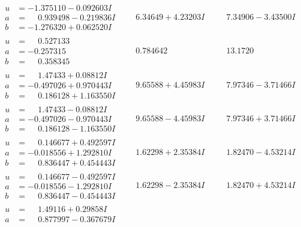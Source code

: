 \documentclass[1p]{elsarticle_modified}
\theoremstyle{definition}
\begin{document}
$$\begin{array}{c|c|c}
\begin{aligned}
u &= -1.375110 - 0.092603 I \\
a &= \phantom{-}0.939498 - 0.219836 I \\
b &= -1.276320 + 0.062520 I\end{aligned}
 & \phantom{-}6.34649 + 4.23203 I & \phantom{-}7.34906 - 3.43500 I \\ \hline\begin{aligned}
u &= \phantom{-}0.527133\phantom{ +0.000000I} \\
a &= -0.257315\phantom{ +0.000000I} \\
b &= \phantom{-}0.358345\phantom{ +0.000000I}\end{aligned}
 & \phantom{-}0.784642\phantom{ +0.000000I} & \phantom{-}13.1720\phantom{ +0.000000I} \\ \hline\begin{aligned}
u &= \phantom{-}1.47433 + 0.08812 I \\
a &= -0.497026 + 0.970443 I \\
b &= \phantom{-}0.186128 + 1.163550 I\end{aligned}
 & \phantom{-}9.65588 + 4.45983 I & \phantom{-}7.97346 - 3.71466 I \\ \hline\begin{aligned}
u &= \phantom{-}1.47433 - 0.08812 I \\
a &= -0.497026 - 0.970443 I \\
b &= \phantom{-}0.186128 - 1.163550 I\end{aligned}
 & \phantom{-}9.65588 - 4.45983 I & \phantom{-}7.97346 + 3.71466 I \\ \hline\begin{aligned}
u &= \phantom{-}0.146677 + 0.492597 I \\
a &= -0.018556 + 1.292810 I \\
b &= \phantom{-}0.836447 + 0.454443 I\end{aligned}
 & \phantom{-}1.62298 + 2.35384 I & \phantom{-}1.82470 - 4.53214 I \\ \hline\begin{aligned}
u &= \phantom{-}0.146677 - 0.492597 I \\
a &= -0.018556 - 1.292810 I \\
b &= \phantom{-}0.836447 - 0.454443 I\end{aligned}
 & \phantom{-}1.62298 - 2.35384 I & \phantom{-}1.82470 + 4.53214 I \\ \hline\begin{aligned}
u &= \phantom{-}1.49116 + 0.29858 I \\
a &= \phantom{-}0.877997 - 0.367679 I \\

\end{aligned}
\end{array}$$
\end{document}
